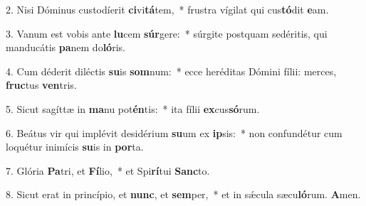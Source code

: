 2. Nisi Dóminus custodíerit \textbf{ci}vi\textbf{tá}tem,~* frustra vígilat qui cus\textbf{tó}dit \textbf{e}am.

3. Vanum est vobis ante \textbf{lu}cem \textbf{súr}gere:~* súrgite postquam sedéritis, qui manducátis \textbf{pa}nem do\textbf{ló}ris.

4. Cum déderit diléctis \textbf{su}is \textbf{som}num:~* ecce heréditas Dómini fílii: merces, \textbf{fruc}tus \textbf{ven}tris.

5. Sicut sagíttæ in \textbf{ma}nu pot\textbf{én}tis:~* ita fílii \textbf{ex}cus\textbf{só}rum.

6. Beátus vir qui implévit desidérium \textbf{su}um ex \textbf{ip}sis:~* non confundétur cum loquétur inimícis \textbf{su}is in \textbf{por}ta.

7. Glória \textbf{Pa}tri, et \textbf{Fí}lio,~* et Spi\textbf{rí}tui \textbf{Sanc}to.

8. Sicut erat in princípio, et \textbf{nunc}, et \textbf{sem}per,~* et in sǽcula sæcu\textbf{ló}rum. \textbf{A}men.
